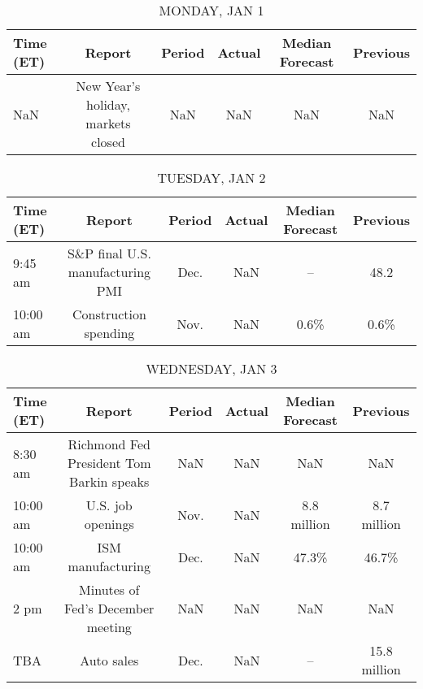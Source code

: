 \documentclass{article}%
\begin{document}
%
\normalsize%


\begin{table}[htbp]%
\caption{MONDAY, JAN 1}%
\centering%
\begin{adjustbox}{width=1\textwidth}%
\begin{tabular}{lccccc}
\toprule
Time (ET) &                             Report & Period & Actual & Median Forecast & Previous \\
\midrule
      NaN & New Year's holiday, markets closed &    NaN &    NaN &             NaN &      NaN \\
\bottomrule
\end{tabular}
%
\end{adjustbox}%
\end{table}

%


\begin{table}[htbp]%
\caption{TUESDAY, JAN 2}%
\centering%
\begin{adjustbox}{width=1\textwidth}%
\begin{tabular}{lccccc}
\toprule
Time (ET) &                           Report & Period & Actual & Median Forecast & Previous \\
\midrule
  9:45 am & S\&P final U.S. manufacturing PMI &   Dec. &    NaN &              -- &     48.2 \\
 10:00 am &            Construction spending &   Nov. &    NaN &            0.6\% &     0.6\% \\
\bottomrule
\end{tabular}
%
\end{adjustbox}%
\end{table}

%


\begin{table}[htbp]%
\caption{WEDNESDAY, JAN 3}%
\centering%
\begin{adjustbox}{width=1\textwidth}%
\begin{tabular}{lccccc}
\toprule
Time (ET) &                                   Report & Period & Actual & Median Forecast &     Previous \\
\midrule
  8:30 am & Richmond Fed President Tom Barkin speaks &    NaN &    NaN &             NaN &          NaN \\
 10:00 am &                        U.S. job openings &   Nov. &    NaN &     8.8 million &  8.7 million \\
 10:00 am &                        ISM manufacturing &   Dec. &    NaN &           47.3\% &        46.7\% \\
     2 pm &        Minutes of Fed's December meeting &    NaN &    NaN &             NaN &          NaN \\
      TBA &                               Auto sales &   Dec. &    NaN &              -- & 15.8 million \\
\bottomrule
\end{tabular}
%
\end{adjustbox}%
\end{table}
\end{document}
